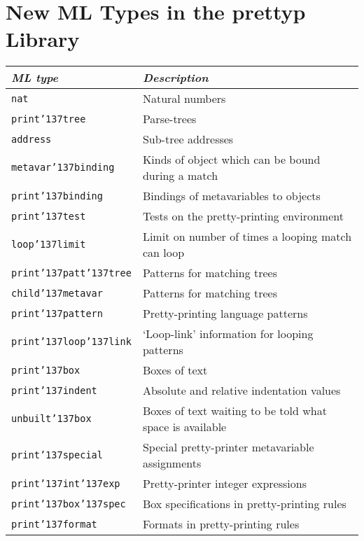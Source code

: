 
\chapter{New ML Types in the prettyp Library}

{\def\_{{\char'137}}		         %

\begin{center}
\begin{tabular}{|l|l|}
\hline
{\it ML type}                     & {\it Description}\\
\hline
{\small\tt nat}                   & Natural numbers \\
{\small\tt print\_tree}           & Parse-trees \\
{\small\tt address}               & Sub-tree addresses \\
{\small\tt metavar\_binding}      & Kinds of object which can be bound during
a match \\
{\small\tt print\_binding}        & Bindings of metavariables to objects \\
{\small\tt print\_test}           & Tests on the pretty-printing environment \\
{\small\tt loop\_limit}           & Limit on number of times a looping match
can loop \\
{\small\tt print\_patt\_tree}     & Patterns for matching trees \\
{\small\tt child\_metavar}        & Patterns for matching trees \\
{\small\tt print\_pattern}        & Pretty-printing language patterns \\
{\small\tt print\_loop\_link}     & `Loop-link' information for looping
patterns \\
{\small\tt print\_box}            & Boxes of text \\
{\small\tt print\_indent}         & Absolute and relative indentation values \\
{\small\tt unbuilt\_box}          & Boxes of text waiting to be told what
space is available \\
{\small\tt print\_special}        & Special pretty-printer metavariable
assignments \\
{\small\tt print\_int\_exp}       & Pretty-printer integer expressions \\
{\small\tt print\_box\_spec}      & Box specifications in pretty-printing
rules \\
{\small\tt print\_format}         & Formats in pretty-printing rules \\

\end{tabular}
\end{center}}
